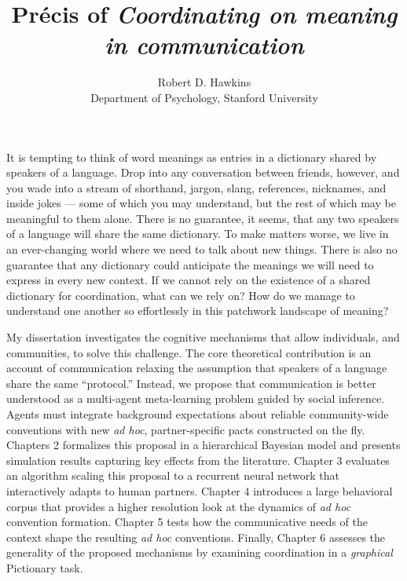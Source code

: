 \documentclass[11pt]{article}
\title{Pr\'ecis of \emph{Coordinating on meaning in communication} }
\author{Robert D. Hawkins \\ \small Department of Psychology, Stanford University}
\date{}
\begin{document}

\maketitle

It is tempting to think of word meanings as entries in a dictionary shared by speakers of a language. 
Drop into any conversation between friends, however, and you wade into a stream of shorthand, jargon, slang, references, nicknames, and inside jokes --- some of which you may understand, but the rest of which may be meaningful to them alone. 
There is no guarantee, it seems, that any two speakers of a language will share the same dictionary.
To make matters worse, we live in an ever-changing world where we need to talk about new things.
There is also no guarantee that any dictionary could anticipate the meanings we will need to express in every new context.
If we cannot rely on the existence of a shared dictionary for coordination, what can we rely on?
How do we manage to understand one another so effortlessly in this patchwork landscape of meaning?

My dissertation investigates the cognitive mechanisms that allow individuals, and communities, to solve this challenge.
The core theoretical contribution is an account of communication relaxing the assumption that speakers of a language share the same ``protocol.''
Instead, we propose that communication is better understood as a multi-agent meta-learning problem guided by social inference.
Agents must integrate background expectations about reliable community-wide conventions with new \emph{ad hoc}, partner-specific pacts constructed on the fly.
Chapters 2 formalizes this proposal in a hierarchical Bayesian model and presents simulation results capturing key effects from the literature. 
Chapter 3 evaluates an algorithm scaling this proposal to a recurrent neural network that interactively adapts to human partners.
Chapter 4 introduces a large behavioral corpus that provides a higher resolution look at the dynamics of \emph{ad hoc} convention formation. %
Chapter 5 tests how the communicative needs of the context shape the resulting \emph{ad hoc} conventions. 
Finally, Chapter 6 assesses the generality of the proposed mechanisms by examining coordination in a \emph{graphical} Pictionary task. 
\end{document}
